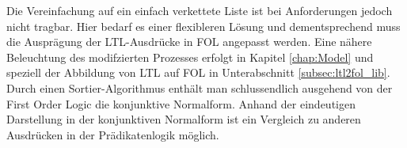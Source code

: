 Die Vereinfachung auf ein einfach verkettete Liste ist bei Anforderungen jedoch nicht tragbar. Hier bedarf es einer flexibleren Lösung und dementsprechend muss die Ausprägung der LTL-Ausdrücke in FOL angepasst werden. Eine nähere Beleuchtung des modifzierten Prozesses erfolgt in Kapitel \ref{chap:Model} und speziell der Abbildung von LTL auf FOL in Unterabschnitt \ref{subsec:ltl2fol_lib}.\\
Durch einen Sortier-Algorithmus enthält man schlussendlich ausgehend von der First Order Logic die konjunktive Normalform. Anhand der eindeutigen Darstellung in der konjunktiven Normalform ist ein Vergleich zu anderen Ausdrücken in der Prädikatenlogik möglich.
